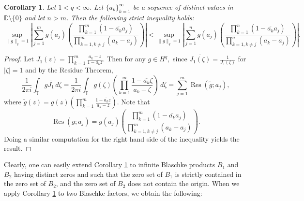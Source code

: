 \documentclass{article}
\theoremstyle{plain}
\numberwithin{Theorem}{section}
\numberwithin{equation}{section}
\theoremstyle{plain}
\newtheorem{Corollary}[Theorem]{Corollary}
\theoremstyle{definition}
\newcommand{\D}{\mathbb{D}}
\newcommand{\T}{\mathbb{T}}
\begin{document}
\begin{Corollary}\label{dual_inequality}
Let $ 1 < q < \infty$. Let $\{ a_k\}_{k=1}^{\infty}$ be a sequence of distinct values in $\D\setminus \{0\}$ and let $n > m$. Then the following strict inequality holds:
\begin{equation*}
 \sup_{\|g\|_q =1}  \left| \sum_{j=1}^m g(a_j) \left( \frac{\prod_{k=1}^m (1 - \overline{a_k} a_j )}{\prod_{k=1, k \neq j}^m (a_k - a_j)} \right) \right| < \sup_{\|g\|_q =1}  \left| \sum_{j=1}^n g(a_j) \left( \frac{\prod_{k=1}^n (1 - \overline{a_k} a_j )}{\prod_{k=1, k \neq j}^n (a_k - a_j)} \right) \right|. 
\end{equation*}
\end{Corollary}
\begin{proof}
Let $J_1(z) = \prod_{k=1}^m \frac{a_k -z}{1 - \overline{a_k}z}$.  Then for any $g \in H^q,$ since $\overline{J_1(\zeta)} = \frac{1}{J_1(\zeta)}$ for $|\zeta| = 1$ and by the Residue Theorem,
\begin{equation*}
    \frac{1}{2 \pi i} \int_{\T} g \overline{J_1} \, d \zeta = \frac{1}{2 \pi i} \int_{\T} g(\zeta) \left( \prod_{k=1}^m \frac{1 - \overline{a_k}\zeta}{a_k -\zeta} \right) \, d \zeta = \sum_{j=1}^m \operatorname{Res }(\tilde{g}; a_j),
\end{equation*}
where $\tilde{g}(z) = g(z) \left( \prod_{k=1}^m \frac{1 - \overline{a_k}z}{a_k -z} \right)$.
Note that 
\begin{equation*}
    \operatorname{Res }(g; a_j) = g(a_j) \left( \frac{\prod_{k=1}^m (1 - \overline{a_k} a_j )}{\prod_{k=1, k \neq j}^m (a_k - a_j)} \right).
\end{equation*}
Doing a similar computation for the right hand side of the inequality yields the result.
\end{proof}

Clearly, one can easily extend Corollary \ref{dual_inequality} to infinite Blaschke products $B_1$ and $B_2$ having distinct zeros and such that the zero set of $B_1$ is strictly contained in the zero set of $B_2$, and the zero set of $B_2$ does not contain the origin.
When we apply Corollary \ref{dual_inequality} to two Blaschke factors, we obtain the following:
\end{document}
